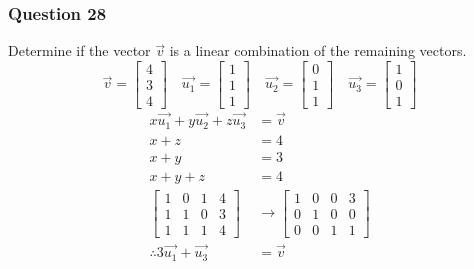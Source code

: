 \documentclass{math}
\begin{document}
\subsubsection*{Question 28}
Determine if the vector \( \vec{v} \) is a linear combination of the
remaining vectors.
\[ \vec{v} = \begin{bmatrix}4 \\ 3 \\ 4\end{bmatrix} \quad
  \vec{u_1} = \begin{bmatrix}1 \\ 1 \\ 1\end{bmatrix} \quad
  \vec{u_2} = \begin{bmatrix}0 \\ 1 \\ 1\end{bmatrix} \quad
  \vec{u_3} = \begin{bmatrix}1 \\ 0 \\ 1\end{bmatrix} \]
\begin{align*}
  x\vec{u_1}+y\vec{u_2}+z\vec{u_3} &= \vec{v} \\
  x+z &= 4 \\
  x+y &= 3 \\
  x+y+z &= 4 \\
  \begin{bmatrix}
    1 & 0 & 1 & 4 \\
    1 & 1 & 0 & 3 \\
    1 & 1 & 1 & 4
  \end{bmatrix} &\to \begin{bmatrix}
    1 & 0 & 0 & 3 \\
    0 & 1 & 0 & 0 \\
    0 & 0 & 1 & 1
  \end{bmatrix} \\
  \therefore 3\vec{u_1}+\vec{u_3} &= \vec{v}
\end{align*}
\end{document}
